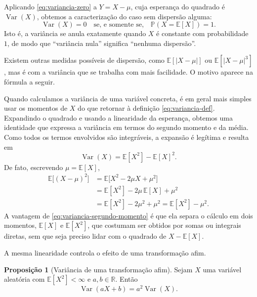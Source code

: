 \documentclass[12pt,portuguese]{article}
\theoremstyle{definition}
\newtheorem{proposition}[proposition]{Proposição}
\theoremstyle{plainexercise}
\theoremstyle{starredexercise}
\theoremstyle{definition}
\begin{document}
Aplicando \eqref{eq:variancia-zero} a $Y=X-\mu$, cuja esperança do quadrado é
$\operatorname{Var}(X)$, obtemos a caracterização do caso sem dispersão alguma:
\begin{equation}\label{eq:variancia-zero-variancia}
\operatorname{Var}(X)=0
\quad\text{se, e somente se,}\quad
\mathbb{P}(X=\mathbb{E}[X])=1.
\end{equation}
Isto é, a variância se anula exatamente quando $X$ é constante com probabilidade
$1$, de modo que ``variância nula'' significa ``nenhuma dispersão''.

Existem outras medidas possíveis de dispersão, como $\mathbb{E}[|X-\mu|]$ ou
$\mathbb{E}[|X-\mu|^3]$, mas é com a variância que se trabalha com mais
facilidade. O motivo aparece na fórmula a seguir.

\medskip

Quando calculamos a variância de uma variável concreta, é em geral mais simples
usar os momentos de $X$ do que retornar à definição \eqref{eq:variancia-def}.
Expandindo o quadrado e usando a linearidade da esperança, obtemos uma
identidade que expressa a variância em termos do segundo momento e da média.
Como todos os termos envolvidos são integráveis, a expansão é legítima e resulta
em
\begin{equation}\label{eq:variancia-segundo-momento}
\operatorname{Var}(X)=\mathbb{E}[X^2]-\mathbb{E}[X]^2.
\end{equation}
De fato, escrevendo $\mu=\mathbb{E}[X]$,
\begin{align*}
\mathbb{E}\bigl[(X-\mu)^2\bigr]
&= \mathbb{E}\bigl[X^2-2\mu X+\mu^2\bigr]
\\[0.3cm]
&= \mathbb{E}[X^2]-2\mu\,\mathbb{E}[X]+\mu^2
\\[0.3cm]
&= \mathbb{E}[X^2]-2\mu^2+\mu^2
= \mathbb{E}[X^2]-\mu^2.
\end{align*}
A vantagem de \eqref{eq:variancia-segundo-momento} é que ela separa o cálculo em
dois momentos, $\mathbb{E}[X]$ e $\mathbb{E}[X^2]$, que costumam ser obtidos por
somas ou integrais diretas, sem que seja preciso lidar com o quadrado de
$X-\mathbb{E}[X]$.

A mesma linearidade controla o efeito de uma transformação afim.

\begin{proposition}[Variância de uma transformação afim]\label{prop:variancia-afim}
Sejam $X$ uma variável aleatória com $\mathbb{E}[X^2]<\infty$ e
$a,b\in\mathbb{R}$. Então
\begin{equation}\label{eq:variancia-linear}
\operatorname{Var}(aX+b)=a^2\operatorname{Var}(X).
\end{equation}
\end{proposition}
\end{document}

